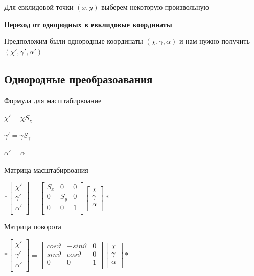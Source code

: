 \documentclass{article}
\begin{document}
    Для евклидовой точки $(x,y)$ выберем некоторую произвольную


    \textbf{ Переход от однородных в евклидовые координаты}

    Предположим были однородные координаты $(\chi, \gamma, \alpha)$ 
    и нам нужно получить $(\chi ', \gamma ', \alpha ')$

    \subsection{Однородные преобразоавания}

    Формула для масштабирвоание 

    $\chi ' = \chi S_\chi$

    $\gamma ' = \gamma S_\gamma$

    $\alpha ' = \alpha$

    Матрица масштабирвоания 

    $*\begin{bmatrix}
        \chi' \\
        \gamma ' \\ 
        \alpha ' \\

    \end{bmatrix}
    =
    \begin{bmatrix}
        S_x & 0  & 0 \\[0.3em]
        0 & S_y  & 0 \\[0.3em]
        0 & 0  & 1 \\[0.3em]
    \end{bmatrix}
    \begin{bmatrix}
        \chi \\
        \gamma  \\ 
        \alpha  \\
    \end{bmatrix}*$


    Матрица поворота


    $*\begin{bmatrix}
        \chi' \\
        \gamma ' \\ 
        \alpha ' \\

    \end{bmatrix}
    =
    \begin{bmatrix}
        cos \vartheta & -sin \vartheta  & 0 \\[0.3em]
        sin \vartheta &  cos \vartheta  & 0 \\[0.3em]
        0 & 0  & 1 \\[0.3em]
    \end{bmatrix}
    \begin{bmatrix}
        \chi \\
        \gamma  \\ 
        \alpha  \\
    \end{bmatrix}*$
\hspace{5mm}
\end{document}
